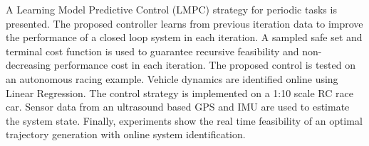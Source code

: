 \documentclass[10pt,twoside,a4paper,fleqn]{report}
\theoremstyle{definition}
\begin{document}


A Learning Model Predictive Control (LMPC) strategy for periodic tasks is presented. The proposed controller learns from previous iteration data to improve the performance of a closed loop system in each iteration. A sampled safe set and terminal cost function is used to guarantee recursive feasibility and non-decreasing performance cost in each iteration. The proposed control is tested on an autonomous racing example. Vehicle dynamics are identified online using Linear Regression. The control strategy is implemented on a 1:10 scale RC race car. Sensor data from an ultrasound based GPS and IMU are used to estimate the system state. Finally, experiments show the real time feasibility of an optimal trajectory generation with online system identification.

\end{document}
